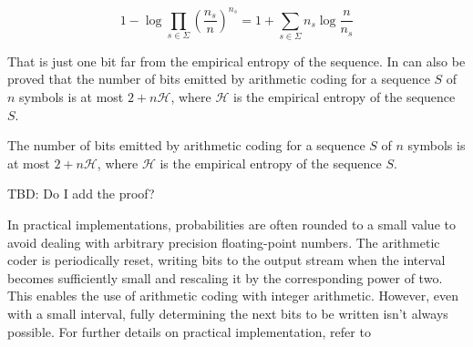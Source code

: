 \begin{equation}
    1 - \log \prod_{s \in \Sigma} \left (\frac{n_s}{n} \right)^{n_s} = 1 + \sum_{s \in \Sigma} n_s \log \frac{n}{n_s}
\end{equation}

\noindent That is just one bit far from the empirical entropy of the sequence. In can also be proved \cite{ferragina2023pearls, han2002mathematics, sayood2002lossless} that the number of bits emitted by arithmetic coding for a sequence $S$ of $n$ symbols is at most $2 + n\mathcal{H}$, where $\mathcal{H}$ is the empirical entropy of the sequence $S$.

\begin{theorem}
    The number of bits emitted by arithmetic coding for a sequence $S$ of $n$ symbols is at most $2 + n\mathcal{H}$, where $\mathcal{H}$ is the empirical entropy of the sequence $S$.
\end{theorem}

TBD: Do I add the proof?

\begin{remark}
    In practical implementations, probabilities are often rounded to a small value to avoid dealing with arbitrary precision floating-point numbers. The arithmetic coder is periodically reset, writing bits to the output stream when the interval becomes sufficiently small and rescaling it by the corresponding power of two. This enables the use of arithmetic coding with integer arithmetic. However, even with a small interval, fully determining the next bits to be written isn't always possible. For further details on practical implementation, refer to \cite{moffat1998arithmetic}
\end{remark}
